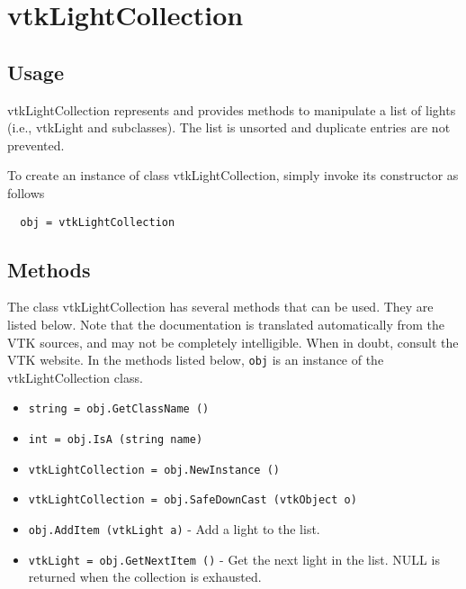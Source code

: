 \section{vtkLightCollection}

\subsection{Usage}

 vtkLightCollection represents and provides methods to manipulate a list of
 lights (i.e., vtkLight and subclasses). The list is unsorted and duplicate
 entries are not prevented.

To create an instance of class vtkLightCollection, simply
invoke its constructor as follows
\begin{verbatim}
  obj = vtkLightCollection
\end{verbatim}
\subsection{Methods}

The class vtkLightCollection has several methods that can be used.
  They are listed below.
Note that the documentation is translated automatically from the VTK sources,
and may not be completely intelligible.  When in doubt, consult the VTK website.
In the methods listed below, \verb|obj| is an instance of the vtkLightCollection class.
\begin{itemize}
\item  \verb|string = obj.GetClassName ()|

\item  \verb|int = obj.IsA (string name)|

\item  \verb|vtkLightCollection = obj.NewInstance ()|

\item  \verb|vtkLightCollection = obj.SafeDownCast (vtkObject o)|

\item  \verb|obj.AddItem (vtkLight a)| -  Add a light to the list.

\item  \verb|vtkLight = obj.GetNextItem ()| -  Get the next light in the list. NULL is returned when the collection is 
 exhausted.

\end{itemize}
